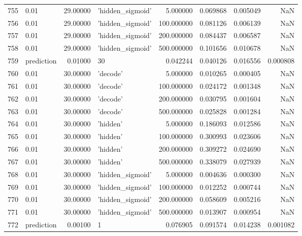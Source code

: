 \documentclass[10pt,a4paper]{article}
\begin{document}
\begin{tabular}{llrlrrrr}
755  &        0.01 &  29.00000 &   'hidden\_sigmoid' &    5.000000 &  0.069868 &  0.005049 &       NaN \\
756  &        0.01 &  29.00000 &   'hidden\_sigmoid' &  100.000000 &  0.081126 &  0.006139 &       NaN \\
757  &        0.01 &  29.00000 &   'hidden\_sigmoid' &  200.000000 &  0.084437 &  0.006587 &       NaN \\
758  &        0.01 &  29.00000 &   'hidden\_sigmoid' &  500.000000 &  0.101656 &  0.010678 &       NaN \\
759  &  prediction &   0.01000 &                 30 &    0.042244 &  0.040126 &  0.016556 &  0.000808 \\
760  &        0.01 &  30.00000 &           'decode' &    5.000000 &  0.010265 &  0.000405 &       NaN \\
761  &        0.01 &  30.00000 &           'decode' &  100.000000 &  0.024172 &  0.001348 &       NaN \\
762  &        0.01 &  30.00000 &           'decode' &  200.000000 &  0.030795 &  0.001604 &       NaN \\
763  &        0.01 &  30.00000 &           'decode' &  500.000000 &  0.025828 &  0.001284 &       NaN \\
764  &        0.01 &  30.00000 &           'hidden' &    5.000000 &  0.186093 &  0.012586 &       NaN \\
765  &        0.01 &  30.00000 &           'hidden' &  100.000000 &  0.300993 &  0.023606 &       NaN \\
766  &        0.01 &  30.00000 &           'hidden' &  200.000000 &  0.309272 &  0.024690 &       NaN \\
767  &        0.01 &  30.00000 &           'hidden' &  500.000000 &  0.338079 &  0.027939 &       NaN \\
768  &        0.01 &  30.00000 &   'hidden\_sigmoid' &    5.000000 &  0.004636 &  0.000300 &       NaN \\
769  &        0.01 &  30.00000 &   'hidden\_sigmoid' &  100.000000 &  0.012252 &  0.000744 &       NaN \\
770  &        0.01 &  30.00000 &   'hidden\_sigmoid' &  200.000000 &  0.058609 &  0.005216 &       NaN \\
771  &        0.01 &  30.00000 &   'hidden\_sigmoid' &  500.000000 &  0.013907 &  0.000954 &       NaN \\
772  &  prediction &   0.00100 &                  1 &    0.076905 &  0.091574 &  0.014238 &  0.001082 \\

\end{tabular}
\end{document}
